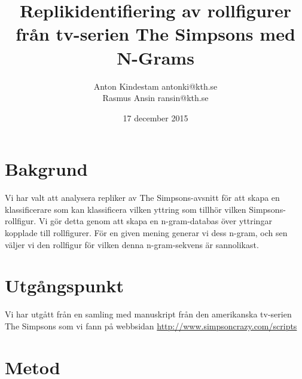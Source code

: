 \documentclass[a5paper]{article}
\author{Anton Kindestam antonki@kth.se\\Rasmus Ansin ransin@kth.se}
\title{Replikidentifiering av rollfigurer från tv-serien The Simpsons med N-Grams}
\date{17 december 2015}
\begin{document}
\maketitle
\tableofcontents


\section{Bakgrund}
Vi har valt att analysera repliker av The Simpsons-avsnitt för att skapa en
klassificerare som kan klassificera vilken yttring som tillhör vilken
Simpsons-rollfigur. Vi gör detta genom att skapa en n-gram-databas över
yttringar kopplade till rollfigurer. För en given mening generar vi dess n-gram,
och sen väljer vi den rollfigur för vilken denna n-gram-sekvens är sannolikast.


\section{Utgångspunkt}

Vi har utgått från en samling med manuskript från den amerikanska
tv-serien The Simpsons som vi fann på webbsidan
\url{http://www.simpsoncrazy.com/scripts}

\section{Metod}
\end{document}
